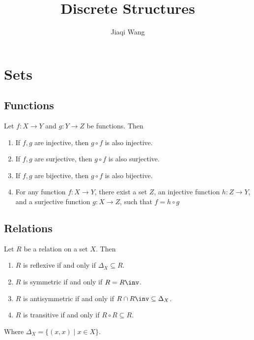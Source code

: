 \documentclass{classnotes}
\author{Jiaqi Wang}
\title{Discrete Structures}
\begin{document}
\maketitle

\tableofcontents
\newpage

\section{Sets}
\subsection{Functions}
\begin{proposition}
    Let $f: X \to Y$ and $g: Y \to Z$ be functions. Then
    \begin{enumerate}[label=(\roman*)]
        \item If $f,g$ are injective, then $g \circ f$ is also injective.
        \item If $f,g$ are surjective, then $g \circ f$ is also surjective.
        \item If $f,g$ are bijective, then $g \circ f$ is also bijective.
        \item For any function $f: X \to Y$, there exist a set $Z$, an injective 
            function $h: Z\to Y$, and a surjective function $g: X \to Z$, such that $f = h \circ g$
    \end{enumerate}
\end{proposition}
\subsection{Relations}
\begin{proposition}
    Let $R$ be a relation on a set $X$. Then
    \begin{enumerate}
        \item $R$ is reflexive if and only if $\Delta_X \subseteq R$. 
        \item $R$ is symmetric if and only if $R = R\inv$.
        \item $R$ is antisymmetric if and only if $R \cap R\inv \subseteq \Delta_X$.
        \item $R$ is transitive if and only if $R \circ R \subseteq R$.
    \end{enumerate}
    Where $\Delta_X = \{(x,x) \mid x \in X\}$.
\end{proposition}
\end{document}
